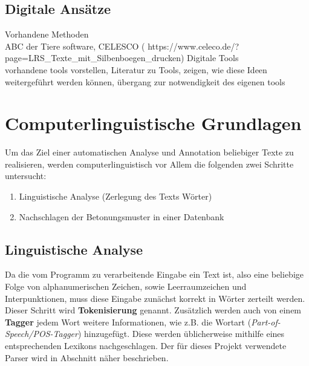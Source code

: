 \subsection{Digitale Ansätze}
Vorhandene Methoden\\
ABC der Tiere software, CELESCO ( https://www.celeco.de/?page=LRS\_Texte\_mit\_Silbenboegen\_drucken)
Digitale Tools\\

vorhandene tools vorstellen, Literatur zu Tools, zeigen, wie diese Ideen weitergeführt werden können, übergang zur notwendigkeit des eigenen tools\\

\section{Computerlinguistische Grundlagen}

Um das Ziel einer automatischen Analyse und Annotation beliebiger Texte zu realisieren, werden computerlinguistisch vor Allem die folgenden zwei Schritte untersucht:
\begin{enumerate}
	\item Linguistische Analyse (Zerlegung des Texts Wörter)
	\item Nachschlagen der Betonungsmuster in einer Datenbank
\end{enumerate}

\subsection{Linguistische Analyse}
Da die vom Programm zu verarbeitende Eingabe ein Text ist, also eine beliebige Folge von alphanumerischen Zeichen, sowie Leerraumzeichen und Interpunktionen, muss diese Eingabe zunächst korrekt in Wörter zerteilt werden. Dieser Schritt wird \textbf{Tokenisierung} genannt. Zusätzlich werden auch von einem \textbf{Tagger} jedem Wort weitere Informationen, wie z.B. die Wortart (\textit{Part-of-Speech/POS-Tagger}) hinzugefügt. Diese werden üblicherweise mithilfe eines entsprechenden Lexikons nachgeschlagen. \cite{Carstensen2009} Der für dieses Projekt verwendete Parser wird in Abschnitt  näher beschrieben.

\\

